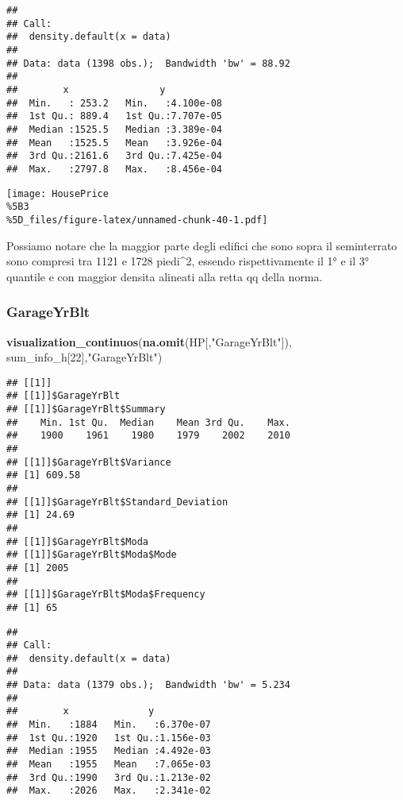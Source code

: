 \documentclass[
]{article}
\newenvironment{Shaded}{\begin{snugshade}}{\end{snugshade}}
\newcommand{\DecValTok}[1]{\textcolor[rgb]{0.00,0.00,0.81}{#1}}
\newcommand{\FunctionTok}[1]{\textcolor[rgb]{0.13,0.29,0.53}{\textbf{#1}}}
\newcommand{\NormalTok}[1]{#1}
\newcommand{\StringTok}[1]{\textcolor[rgb]{0.31,0.60,0.02}{#1}}
\begin{document}
\begin{verbatim}
## 
## Call:
##  density.default(x = data)
## 
## Data: data (1398 obs.);  Bandwidth 'bw' = 88.92
## 
##        x                y            
##  Min.   : 253.2   Min.   :4.100e-08  
##  1st Qu.: 889.4   1st Qu.:7.707e-05  
##  Median :1525.5   Median :3.389e-04  
##  Mean   :1525.5   Mean   :3.926e-04  
##  3rd Qu.:2161.6   3rd Qu.:7.425e-04  
##  Max.   :2797.8   Max.   :8.456e-04
\end{verbatim}

\texttt{[image: HousePrice\\\%5B3\\\%5D\_files/figure-latex/unnamed-chunk-40-1.pdf]}

Possiamo notare che la maggior parte degli edifici che sono sopra il
seminterrato sono compresi tra 1121 e 1728 piedi\^{}2, essendo
rispettivamente il 1° e il 3° quantile e con maggior densita alineati
alla retta qq della norma.

\subsubsection{GarageYrBlt}\label{garageyrblt}

\begin{Shaded}
\begin{Highlighting}[]
\FunctionTok{visualization\_continuos}\NormalTok{(}\FunctionTok{na.omit}\NormalTok{(HP[,}\StringTok{"GarageYrBlt"}\NormalTok{]), sum\_info\_h[}\DecValTok{22}\NormalTok{],}\StringTok{"GarageYrBlt"}\NormalTok{)}
\end{Highlighting}
\end{Shaded}

\begin{verbatim}
## [[1]]
## [[1]]$GarageYrBlt
## [[1]]$GarageYrBlt$Summary
##    Min. 1st Qu.  Median    Mean 3rd Qu.    Max. 
##    1900    1961    1980    1979    2002    2010 
## 
## [[1]]$GarageYrBlt$Variance
## [1] 609.58
## 
## [[1]]$GarageYrBlt$Standard_Deviation
## [1] 24.69
## 
## [[1]]$GarageYrBlt$Moda
## [[1]]$GarageYrBlt$Moda$Mode
## [1] 2005
## 
## [[1]]$GarageYrBlt$Moda$Frequency
## [1] 65
\end{verbatim}

\begin{verbatim}
## 
## Call:
##  density.default(x = data)
## 
## Data: data (1379 obs.);  Bandwidth 'bw' = 5.234
## 
##        x              y            
##  Min.   :1884   Min.   :6.370e-07  
##  1st Qu.:1920   1st Qu.:1.156e-03  
##  Median :1955   Median :4.492e-03  
##  Mean   :1955   Mean   :7.065e-03  
##  3rd Qu.:1990   3rd Qu.:1.213e-02  
##  Max.   :2026   Max.   :2.341e-02
\end{verbatim}
\end{document}
